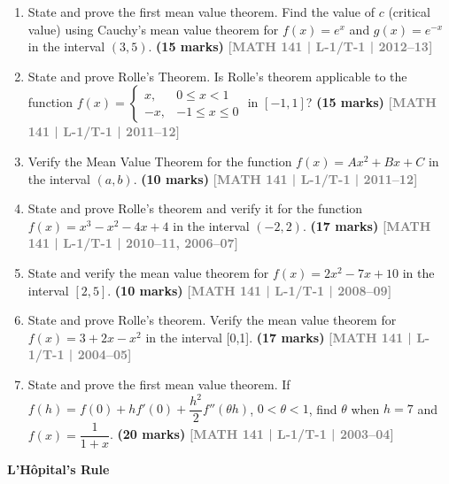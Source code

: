 \documentclass[12pt,a3paper]{article}
\newcommand{\yr}[1]{\hfill\textcolor{gray}{\small\textbf{[#1]}}}
\newcommand{\mk}[1]{\textcolor{orange!70!black}{\small\textbf{(#1 marks)}}}
\newcommand{\subtopic}[2]{%
  \vspace{10pt}
  \noindent\begin{tcolorbox}[colback=#1!8,colframe=#1,boxrule=0.6pt,arc=4pt,
    left=6pt,right=6pt,top=4pt,bottom=4pt]
    \small\bfseries\textcolor{#1}{#2}
  \end{tcolorbox}
  \vspace{2pt}
}
\begin{document}
\begin{enumerate}
\item State and prove the first mean value theorem. Find the value of $c$ (critical value) using Cauchy's mean value theorem for $f(x)=e^{x}$ and $g(x)=e^{-x}$ in the interval $(3,5)$.
\mk{15} \yr{MATH 141 | L-1/T-1 | 2012--13}

\item State and prove Rolle's Theorem. Is Rolle's theorem applicable to the function
$f(x)=\begin{cases}x, & 0\le x<1\\ -x, & -1\leq x \leq0\end{cases}$
in $[-1,1]$?
\mk{15} \yr{MATH 141 | L-1/T-1 | 2011--12}

\item Verify the Mean Value Theorem for the function $f(x)=Ax^{2}+Bx+C$ in the interval $(a,b)$.
\mk{10} \yr{MATH 141 | L-1/T-1 | 2011--12}


\item State and prove Rolle's theorem and verify it for the function $f(x)=x^{3}-x^{2}-4x+4$ in the interval $(-2,2)$.
\mk{17} \yr{MATH 141 | L-1/T-1 | 2010--11, 2006--07}

\item State and verify the mean value theorem for $f(x)=2x^{2}-7x+10$ in the interval $[2,5]$.
\mk{10} \yr{MATH 141 | L-1/T-1 | 2008--09}

\item State and prove Rolle's theorem. Verify the mean value theorem for $f(x)=3+2x-x^{2}$ in the interval [0,1].
\mk{17} \yr{MATH 141 | L-1/T-1 | 2004--05}

\item State and prove the first mean value theorem. If $f(h)=f(0)+hf'(0)+\dfrac{h^{2}}{2}f''(\theta h)$, $0<\theta<1$, find $\theta$ when $h=7$ and $f(x)=\dfrac{1}{1+x}$.
\mk{20} \yr{MATH 141 | L-1/T-1 | 2003--04}

\end{enumerate}

\subtopic{cA}{L'H\^{o}pital's Rule}
\label{sub:s1-lhospital}
\end{document}
